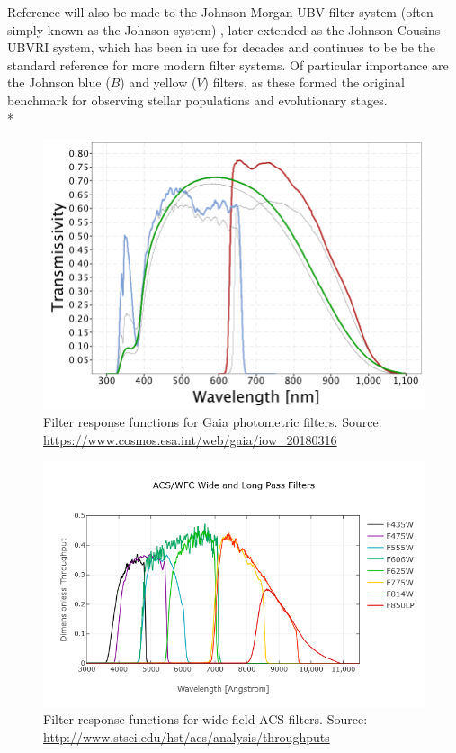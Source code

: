 \documentclass[12pt, a4paper]{report}
\begin{document}
Reference will also be made to the Johnson-Morgan UBV filter system (often simply known as the Johnson system) \citep{1953ApJ...117..313J}, later extended as the Johnson-Cousins UBVRI \citep{1990PASP..102.1181B} system, which has been in use for decades and continues to be be the standard reference for more modern filter systems. Of particular importance are the Johnson blue ($B$) and yellow ($V$) filters, as these formed the original benchmark for observing stellar populations and evolutionary stages. \\*

\begin{figure}[h!]
\begin{center}
\includegraphics[width=1.0\textwidth]{GaiaDR2Passbands.png}
\caption{Filter response functions for Gaia photometric filters. Source: \protect\url{https://www.cosmos.esa.int/web/gaia/iow_20180316}}
\label{Gaia_response_funcs}
\end{center}
\end{figure}

\begin{figure}[h]
\begin{center}
\includegraphics[width=1.0\textwidth]{ACS_Wide.png}
\caption{Filter response functions for wide-field ACS filters. Source: \protect\url{http://www.stsci.edu/hst/acs/analysis/throughputs}}
\label{ACS_response_funcs}
\end{center}
\end{figure}
\end{document}
